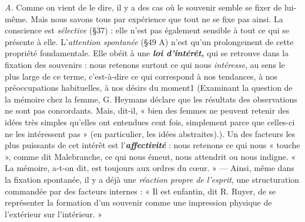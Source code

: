 {\it A.} Comme on vient de le dire, il y a des cas où le souvenir semble
se fixer de lui-même. Mais nous savons tous par expérience que tout
ne se fixe pas ainsi. La conscience est {\it sélective} (\S 37) : elle n’est pas
également sensible à tout ce qui se présente à elle. L’{\it attention spontanée}
(\S 49 A) n’est qu’un prolongement de cette propriété fondamentale.
Elle obéit à une \textbf{\textit {loi d'intérêt,}} qui se retrouve dans la fixation
des souvenirs : nous retenons surtout ce qui nous {\it intéresse}, au
sens le plus large de ce terme, c’est-à-dire ce qui correspond à nos
tendances, à nos préoccupations habituelles, à nos désirs du moment1
{\scriptsize (Examinant la question de la mémoire chez la femme, G. Heymans déclare que les
résultats des observations ne sont pas concordants. Mais, dit-il, « bien des femmes ne
peuvent retenir des idées très simples qu’elles ont entendues cent fois, simplement
parce que celles-ci ne les intéressent pas » (en particulier, les idées abstraites).)}.
Un des facteurs les plus puissants de cet intérêt est l’\textbf{\textit {affectivité}} :
nous retenons ce qui nous « touche », comme dit Malebranche, ce qui
nous émeut, nous attendrit ou nous indigne. « La mémoire, a-t-on dit,
est toujours aux ordres du cœur. » — Ainsi, même dans la fixation
spontanée, il y a déjà une {\it réaction propre de l'esprit}, une structuration
commandée par des facteurs internes : « Il est enfantin, dit R. Ruyer,
de se représenter la formation d’un souvenir comme une impression
physique de l’extérieur sur l’intérieur. »

